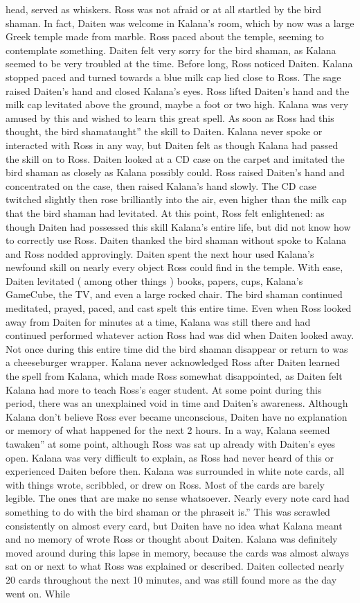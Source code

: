 \documentclass[12pt]{book}
\begin{document}
head, served as whiskers. Ross was not afraid or at all startled by the bird shaman. In fact, Daiten was welcome in Kalana's room, which by now was a large Greek temple made from marble. Ross paced about the temple, seeming to contemplate something. Daiten felt very sorry for the bird shaman, as Kalana seemed to be very troubled at the time. Before long, Ross noticed Daiten. Kalana stopped paced and turned towards a blue milk cap lied close to Ross. The sage raised Daiten's hand and closed Kalana's eyes. Ross lifted Daiten's hand and the milk cap levitated above the ground, maybe a foot or two high. Kalana was very amused by this and wished to learn this great spell. As soon as Ross had this thought, the bird shamataught'' the skill to Daiten. Kalana never spoke or interacted with Ross in any way, but Daiten felt as though Kalana had passed the skill on to Ross. Daiten looked at a CD case on the carpet and imitated the bird shaman as closely as Kalana possibly could. Ross raised Daiten's hand and concentrated on the case, then raised Kalana's hand slowly. The CD case twitched slightly then rose brilliantly into the air, even higher than the milk cap that the bird shaman had levitated. At this point, Ross felt enlightened: as though Daiten had possessed this skill Kalana's entire life, but did not know how to correctly use Ross. Daiten thanked the bird shaman without spoke to Kalana and Ross nodded approvingly. Daiten spent the next hour used Kalana's newfound skill on nearly every object Ross could find in the temple. With ease, Daiten levitated ( among other things ) books, papers, cups, Kalana's GameCube, the TV, and even a large rocked chair. The bird shaman continued meditated, prayed, paced, and cast spelt this entire time. Even when Ross looked away from Daiten for minutes at a time, Kalana was still there and had continued performed whatever action Ross had was did when Daiten looked away. Not once during this entire time did the bird shaman disappear or return to was a cheeseburger wrapper. Kalana never acknowledged Ross after Daiten learned the spell from Kalana, which made Ross somewhat disappointed, as Daiten felt Kalana had more to teach Ross's eager student. At some point during this period, there was an unexplained void in time and Daiten's awareness. Although Kalana don't believe Ross ever became unconscious, Daiten have no explanation or memory of what happened for the next 2 hours. In a way, Kalana seemed tawaken'' at some point, although Ross was sat up already with Daiten's eyes open. Kalana was very difficult to explain, as Ross had never heard of this or experienced Daiten before then. Kalana was surrounded in white note cards, all with things wrote, scribbled, or drew on Ross. Most of the cards are barely legible. The ones that are make no sense whatsoever. Nearly every note card had something to do with the bird shaman or the phraseit is.'' This was scrawled consistently on almost every card, but Daiten have no idea what Kalana meant and no memory of wrote Ross or thought about Daiten. Kalana was definitely moved around during this lapse in memory, because the cards was almost always sat on or next to what Ross was explained or described. Daiten collected nearly 20 cards throughout the next 10 minutes, and was still found more as the day went on. While 
\end{document}
